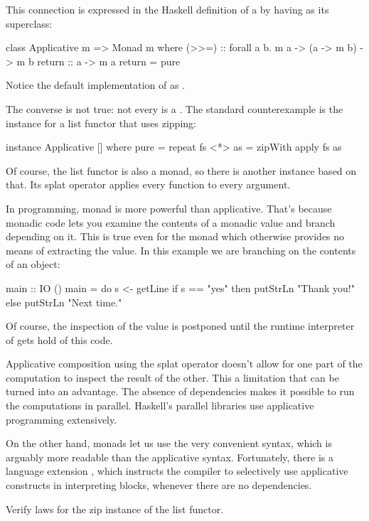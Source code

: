 \documentclass[DaoFP]{subfiles}
\begin{document}
This connection is expressed in the Haskell definition of a  by having  as its superclass:
\begin{haskell}
class Applicative m => Monad m where
    (>>=)       :: forall a b. m a -> (a -> m b) -> m b
    return      :: a -> m a
    return      = pure
\end{haskell}
Notice the default implementation of  as .

The converse is not true: not every  is a . The standard counterexample is the  instance for a list functor that uses zipping:
\begin{haskell}
instance Applicative [] where
  pure = repeat
  fs <*> as = zipWith apply fs as
\end{haskell}
Of course, the list functor is also a monad, so there is another  instance based on that. Its splat operator applies every function to every argument.

In programming, monad is more powerful than applicative. That's because monadic code lets you examine the contents of a monadic value and branch depending on it. This is true even for the  monad which otherwise provides no means of extracting the value. In this example we are branching on the contents of an  object:
\begin{haskell}
main :: IO ()
main = do
  s <- getLine
  if s == "yes"
  then putStrLn "Thank you!"
  else putStrLn "Next time."
\end{haskell}
Of course, the inspection of the value is postponed until the runtime interpreter of  gets hold of this code.

Applicative composition using the splat operator doesn't allow for one part of the computation to inspect the result of the other. This a limitation that can be turned into an advantage. The absence of dependencies makes it possible to run the computations in parallel.  Haskell's parallel libraries use applicative programming extensively.

On the other hand, monads let us use the very convenient  syntax, which is arguably more readable than the applicative syntax. Fortunately, there is a language extension , which instructs the compiler to selectively use applicative constructs in interpreting  blocks, whenever there are no dependencies.

\begin{exercise}
Verify  laws for the zip instance of the list functor.
\end{exercise}
\end{document}
